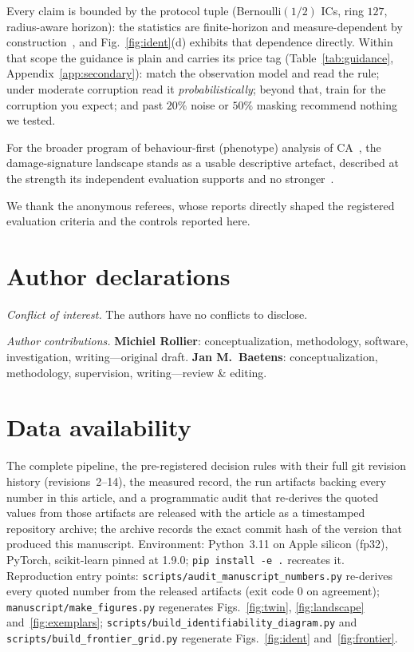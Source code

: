 \documentclass[aip,cha,amsmath,amssymb,reprint,floatfix]{revtex4-2}
\begin{document}
Every claim is bounded by the protocol tuple (Bernoulli$(1/2)$ ICs, ring
$127$, radius-aware horizon): the statistics are finite-horizon and
measure-dependent by construction~\cite{gilman1987,culikyu1988}, and
Fig.~\ref{fig:ident}(d) exhibits that dependence directly. Within that scope the guidance is
plain and carries its price tag (Table~\ref{tab:guidance},
Appendix~\ref{app:secondary}): match the observation model and read the rule; under
moderate corruption read it \emph{probabilistically}; beyond that, train for
the corruption you expect; and past $20\%$ noise or $50\%$ masking recommend
nothing we tested.

For the broader program of behaviour-first (phenotype)
analysis of CA~\cite{wolfram2002,lipackard1990,israeli2006}, the
damage-signature landscape stands as a usable descriptive artefact, described
at the strength its independent evaluation supports and no
stronger~\cite{kleinberg2002,mitchell1993}.

\begin{acknowledgments}
We thank the anonymous referees, whose reports directly shaped the
registered evaluation criteria and the controls reported here.
\end{acknowledgments}

\section*{Author declarations}

\emph{Conflict of interest.} The authors have no conflicts to disclose.

\emph{Author contributions.} \textbf{Michiel Rollier}: conceptualization,
methodology, software, investigation, writing---original draft.
\textbf{Jan M.~Baetens}: conceptualization, methodology, supervision,
writing---review \& editing.

\section*{Data availability}

The complete pipeline, the pre-registered decision rules with their full
git revision history (revisions~2--14), the measured record, the run
artifacts backing every number in this article, and a programmatic audit
that re-derives the quoted values from those artifacts are released with
the article as a timestamped repository archive; the archive records the
exact commit hash of the version that produced this manuscript. Environment:
Python~3.11 on Apple silicon (fp32), PyTorch, scikit-learn pinned at 1.9.0;
\texttt{pip install -e .} recreates it. Reproduction entry points:
\texttt{scripts/audit\_manuscript\_numbers.py} re-derives every quoted
number from the released artifacts (exit code $0$ on agreement);
\texttt{manuscript/make\_figures.py} regenerates
Figs.~\ref{fig:twin}, \ref{fig:landscape} and~\ref{fig:exemplars};
\texttt{scripts/build\_identifiability\_diagram.py} and
\texttt{scripts/build\_frontier\_grid.py} regenerate
Figs.~\ref{fig:ident} and~\ref{fig:frontier}.
\end{document}
